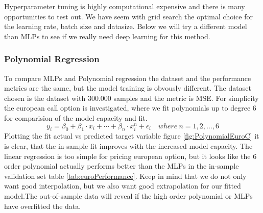 Hyperparameter tuning is highly computational expensive and there is many opportunities to test out. We have seem with grid search the optimal choice for the learning rate, batch size and datasize. Below we will try a different model than MLPs to see if we really need deep learning for this method. 


\subsubsection{Polynomial Regression}
To compare MLPs and Polynomial regression the dataset and the performance metrics are the same, but the model training is obvously different. The dataset chosen is the dataset with 300.000 samples and the metric is MSE. For simplicity the european call option is investigated, where we fit polynomials up to degree 6 for comparision of the model capacity and fit.  
$$y_i=\beta_0 + \beta_1 \cdot x_i + \cdots + \beta_n \cdot x_i^n + \epsilon_i \quad where \ n=1,2,\ldots,6$$
Plotting the fit actual vs predicted target variable figure \ref{fig:PolynomialEuroC} it is clear, that the in-sample fit improves with the increased model capacity. The linear regression is too simple for pricing european option, but it looks like the 6 order polynomial actually performs better than the MLPs in the in-sample validation set table \ref{tab:euroPerformance}. Keep in mind that we do not only want good interpolation, but we also want good extrapolation for our fitted model.The out-of-sample data will reveal if the high order polynomial or MLPs have overfitted the data.\\

